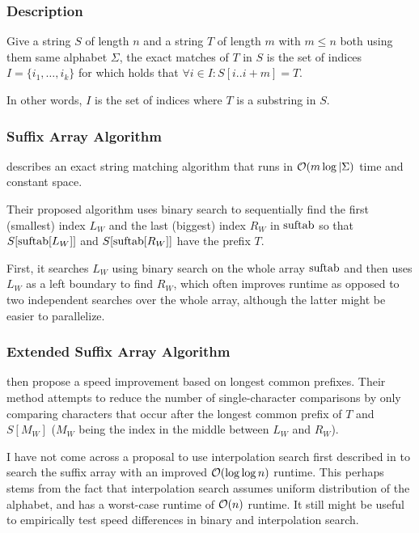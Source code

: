 \documentclass[a4paper,10pt]{article}
\begin{document}
\subsubsection*{Description}

Give a string $S$ of length $n$ and a string $T$ of length $m$ with $m
\le n$ both using them same alphabet $\Sigma$, the exact matches of $T$
in $S$ is the set of indices $I=\{i_1, \ldots, i_k\}$ for which holds
that $\forall i \in I: S[i..i+m]=T$.

In other words, $I$ is the set of indices where $T$ is a substring in $S$.

\subsubsection*{Suffix Array Algorithm}

\citealt{manber1993suffix} describes an exact string matching algorithm
that runs in ${\cal{O}}(m \log|\Sigma)$ time and constant space.

Their proposed algorithm uses binary search to sequentially find
the first (smallest) index $L_{W}$ and the last (biggest) index
$R_{W}$ in $\hbox{suftab}$ so that $S[\hbox{suftab}[L_{W}]]$ and
$S[\hbox{suftab}[R_{W}]]$ have the prefix $T$.

First, it searches $L_{W}$ using binary search on the whole array
$\hbox{suftab}$ and then uses $L_{W}$ as a left boundary to find $R_{W}$,
which often improves runtime as opposed to two independent searches
over the whole array, although the latter might be easier to parallelize.

\subsubsection*{Extended Suffix Array Algorithm}

\citealt{manber1993suffix} then propose a speed improvement based on
longest common prefixes. Their method attempts to reduce the number of
single-character comparisons by only comparing characters that occur
after the longest common prefix of $T$ and $S[M_{W}]$ ($M_{W}$ being
the index in the middle between $L_{W}$ and $R_{W}$).


I have not come across a proposal to use interpolation search first
described in \citealt{perl1978interpolation} to search the suffix array
with an improved ${\cal{O}}(\log \log n)$ runtime.  This perhaps stems
from the fact that interpolation search assumes uniform distribution of
the alphabet, and has a worst-case runtime of ${\cal{O}}(n)$ runtime. It
still might be useful to empirically test speed differences in binary
and interpolation search.
\end{document}
